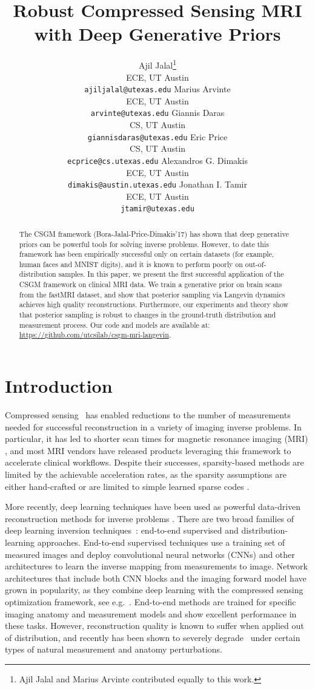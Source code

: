 \documentclass{article}
\title{Robust Compressed Sensing MRI with Deep Generative Priors}
\author{%
Ajil Jalal\thanks{Ajil Jalal and Marius Arvinte contributed equally to this work.}\\
ECE, UT Austin \\ 
\texttt{ajiljalal@utexas.edu} 
\And
Marius Arvinte\printfnsymbol{1}  \\ 
ECE, UT Austin \\ 
\texttt{arvinte@utexas.edu}  
\And 
Giannis Daras \\ 
CS, UT Austin \\
\texttt{giannisdaras@utexas.edu} 
\AND
Eric Price \\ 
CS, UT Austin \\
\texttt{ecprice@cs.utexas.edu} 
\And
Alexandros G. Dimakis \\ 
ECE, UT Austin \\ 
\texttt{dimakis@austin.utexas.edu} 
\And 
Jonathan I. Tamir \\ 
ECE, UT Austin \\ 
\texttt{jtamir@utexas.edu} 
}
\newcounter{example}[section]
\begin{document}
\maketitle

\begin{abstract} 
The CSGM framework (Bora-Jalal-Price-Dimakis'17) has shown that deep
generative priors can be powerful tools for solving inverse problems.
However, to date this framework has been empirically successful only on
certain datasets (for example, human faces and MNIST digits), and it
is known to perform poorly on out-of-distribution samples. In this
paper, we present the first successful application of the CSGM
framework on clinical MRI data. We train a generative prior on brain
scans from the fastMRI dataset, and show that posterior sampling via
Langevin dynamics achieves high quality reconstructions. Furthermore,
our experiments and theory show that posterior sampling is robust to
changes in the ground-truth distribution and measurement process.
Our code and models are available at: 
\url{https://github.com/utcsilab/csgm-mri-langevin}.
\end{abstract}

\section{Introduction}

Compressed sensing~\cite{donoho2006compressed,candes2008restricted}
has enabled reductions to the number of measurements needed for
successful reconstruction in a variety of imaging inverse problems. In
particular, it has led to shorter scan times for magnetic resonance
imaging (MRI) \cite{lustig2007sparse,vasanawala2010csmri}, and most
MRI vendors have released products leveraging this framework to
accelerate clinical workflows.  Despite their successes,
sparsity-based methods are limited by the achievable acceleration
rates, as the sparsity assumptions are either hand-crafted or are
limited to simple learned sparse codes
\cite{bresler2011dictionarylearning,ravishankar2017datadriven}. 

More recently, deep learning techniques have been used as powerful
data-driven reconstruction methods for inverse problems
\cite{unser2017deepinverse,ongie2020deep}. There are two broad
families of deep learning inversion techniques~\cite{ongie2020deep}:
end-to-end supervised and distribution-learning approaches.
End-to-end supervised techniques use a training set of measured images
and deploy convolutional neural networks (CNNs) and other
architectures to learn the inverse mapping from measurements to image.
Network architectures that include both CNN blocks and the imaging
forward model have grown in popularity, as they combine deep learning
with the compressed sensing optimization framework, see
e.g.~\cite{hammernik2018learning,aggarwal2018modl,mardani2018deep}.
End-to-end methods are trained for specific imaging anatomy and
measurement models and show excellent performance in these tasks.
However, reconstruction quality is known to suffer when applied out of
distribution, and recently has been shown to severely
degrade~\cite{antun2020instabilities,darestani2021measuring} under
certain types of natural measurement and anatomy perturbations. 
\end{document}
